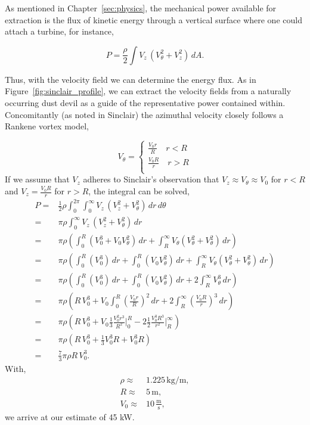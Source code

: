 \label{scaling}

As mentioned in Chapter~\ref{sec:physics}, the mechanical power
available for extraction is the flux of kinetic energy through a
vertical surface where one could attach a turbine, for instance, 

\begin{equation}
 P = \frac{\rho }{2} \int V_z \, (V_{\theta}^2 + V_z^2 ) \, dA. 
\end{equation}

Thus, with the velocity field we can determine the energy
flux. As in Figure~\ref{fig:sinclair_profile}, we can extract the
velocity fields from a naturally occurring dust devil as a guide of the 
representative power contained within. Concomitantly (as noted in
Sinclair) the azimuthal velocity closely follows a Rankene vortex model,   

\begin{equation}
 V_{\theta} = 
  \begin{cases}
   \frac{V_0 r}{R} \quad r < R \\
   \frac{V_0 R}{r} \quad r > R \\
  \end{cases}
\end{equation}
%
If we assume that $V_z$ adheres to Sinclair's observation that $V_z \approx
V_{\theta} \approx V_0$ for $r < R$ and $V_z=\frac{V_0 R}{r}$ for $r > R$,
the integral can be solved, 
\begin{eqnarray}
 P =& \frac{1}{2} \rho \int_0^{2\pi}\int_0^{\infty} V_z \, (V^2_z +
  V_{\theta}^2)\, dr \, d\theta \\ 
 =& \pi \rho \int_0^{\infty} V_z \, (V^2_z + V_{\theta}^2)\, dr \\
 =& \pi \rho \left( \int_0^R (V_0^3 + V_0 V_{\theta}^2)\,dr +
	      \int_R^{\infty} V_{\theta} (V_{\theta}^2 + V_{\theta}^2)\,dr 
	     \right) \\
 =& \pi \rho \left( \int_0^R (V_0^3)\, dr + \int_0^R (V_0 V_{\theta}^2)\,dr +
	      \int_R^{\infty} V_{\theta} (V_{\theta}^2 + V_{\theta}^2) \,dr 
		     \right) \\
 =& \pi \rho \left( \int_0^R (V_0^3)\, dr + \int_0^R (V_0 V_{\theta}^2)\,dr +
	      2 \int_R^{\infty} V_{\theta}^3 \,dr 
		     \right) \\
 =& \pi \rho \left( R\, V_0^3 + V_0 \int_0^R (\frac{V_0 r}{R})^2\,dr +
	      2 \int_R^{\infty} (\frac{V_0 R}{r})^3 \,dr 
		     \right) \\
 =& \pi \rho \left( R\, V_0^3 + V_0 \frac{1}{3} \frac{V_0^2 r^3}{R^2}\rvert_0^R -
	      2 \frac{1}{2} \frac{V_0^3 R^3}{r^2}\rvert_R^{\infty}
		      \right) \\
 =& \pi \rho \left( R\, V_0^3 + \frac{1}{3} V_0^3 R + V_0^3 R \right)\\
 =& \frac{7}{3}\pi \rho R\, V_0^3.
\end{eqnarray}
%
%
%
%
With, 
\begin{eqnarray}
 \rho \approx& 1.225 \,\text{kg}/\text{m}, \\
 R \approx& 5 \,\text{m}, \\
 V_0 \approx& 10 \,\frac{\text{m}}{\text{s}},
\end{eqnarray}
we arrive at our estimate of 45 kW.

%
%